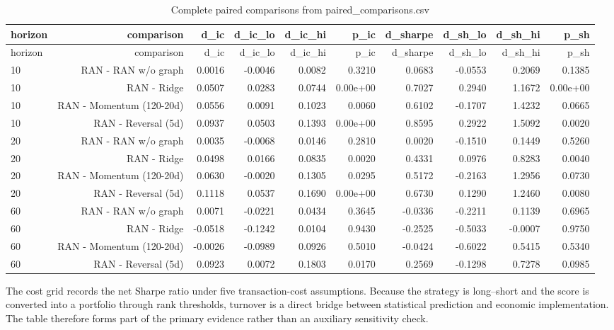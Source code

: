 \documentclass[10pt]{article}
\begin{document}
\begingroup\scriptsize\setlength{\tabcolsep}{3pt}
\begin{longtable}{lrrrrrrrrr}
\caption{Complete paired comparisons from paired\_comparisons.csv}\label{tab:pairedall}\\
\toprule
horizon & comparison & d\_ic & d\_ic\_lo & d\_ic\_hi & p\_ic & d\_sharpe & d\_sh\_lo & d\_sh\_hi & p\_sh \\
\midrule
\endfirsthead
\toprule
horizon & comparison & d\_ic & d\_ic\_lo & d\_ic\_hi & p\_ic & d\_sharpe & d\_sh\_lo & d\_sh\_hi & p\_sh \\
\midrule
\endhead
10 & RAN - RAN w/o graph & 0.0016 & -0.0046 & 0.0082 & 0.3210 & 0.0683 & -0.0553 & 0.2069 & 0.1385 \\
10 & RAN - Ridge & 0.0507 & 0.0283 & 0.0744 & 0.00e+00 & 0.7027 & 0.2940 & 1.1672 & 0.00e+00 \\
10 & RAN - Momentum (120-20d) & 0.0556 & 0.0091 & 0.1023 & 0.0060 & 0.6102 & -0.1707 & 1.4232 & 0.0665 \\
10 & RAN - Reversal (5d) & 0.0937 & 0.0503 & 0.1393 & 0.00e+00 & 0.8595 & 0.2922 & 1.5092 & 0.0020 \\
20 & RAN - RAN w/o graph & 0.0035 & -0.0068 & 0.0146 & 0.2810 & 0.0020 & -0.1510 & 0.1449 & 0.5260 \\
20 & RAN - Ridge & 0.0498 & 0.0166 & 0.0835 & 0.0020 & 0.4331 & 0.0976 & 0.8283 & 0.0040 \\
20 & RAN - Momentum (120-20d) & 0.0630 & -0.0020 & 0.1305 & 0.0295 & 0.5172 & -0.2163 & 1.2956 & 0.0730 \\
20 & RAN - Reversal (5d) & 0.1118 & 0.0537 & 0.1690 & 0.00e+00 & 0.6730 & 0.1290 & 1.2460 & 0.0080 \\
60 & RAN - RAN w/o graph & 0.0071 & -0.0221 & 0.0434 & 0.3645 & -0.0336 & -0.2211 & 0.1139 & 0.6965 \\
60 & RAN - Ridge & -0.0518 & -0.1242 & 0.0104 & 0.9430 & -0.2525 & -0.5033 & -0.0007 & 0.9750 \\
60 & RAN - Momentum (120-20d) & -0.0026 & -0.0989 & 0.0926 & 0.5010 & -0.0424 & -0.6022 & 0.5415 & 0.5340 \\
60 & RAN - Reversal (5d) & 0.0923 & 0.0072 & 0.1803 & 0.0170 & 0.2569 & -0.1298 & 0.7278 & 0.0985 \\
\bottomrule
\end{longtable}
\endgroup

The cost grid records the net Sharpe ratio under five transaction-cost assumptions. Because the strategy is long--short and the score is converted into a portfolio through rank thresholds, turnover is a direct bridge between statistical prediction and economic implementation. The table therefore forms part of the primary evidence rather than an auxiliary sensitivity check.
\end{document}
